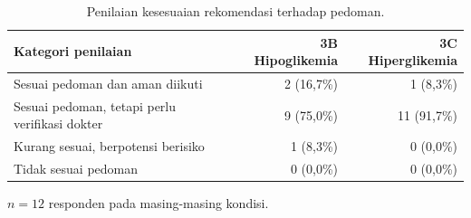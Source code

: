 \begin{table}[!htbp]

\centering

\caption{Penilaian kesesuaian rekomendasi terhadap pedoman.}

\label{tab:tab6.18_kesesuaian_rekomendasi}

    \begin{tabularx}{\textwidth}{@{}L r r@{}}

    \hline

    \textbf{Kategori penilaian} & \textbf{3B Hipoglikemia} & \textbf{3C Hiperglikemia} \\

    \hline

    Sesuai pedoman dan aman diikuti & 2 (16,7\%) & 1 (8,3\%) \\

    Sesuai pedoman, tetapi perlu verifikasi dokter & 9 (75,0\%) & 11 (91,7\%) \\

    Kurang sesuai, berpotensi berisiko & 1 (8,3\%) & 0 (0,0\%) \\

    Tidak sesuai pedoman & 0 (0,0\%) & 0 (0,0\%) \\

    \hline

    \end{tabularx}



    \noindent\tabnotestyle $n = 12$ responden pada masing-masing kondisi.\normalsize

\end{table}

